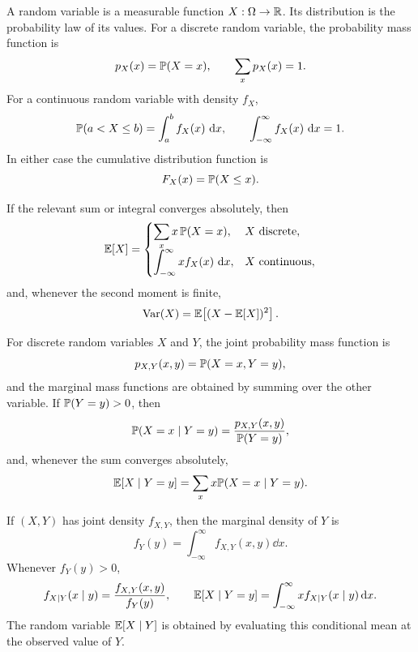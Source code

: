     \begin{definition}
        A random variable is a measurable function $X:\Omega\to\mathbb{R}$. Its
        distribution is the probability law of its values. For a discrete
        random variable, the probability mass function is
        \[
            p_X(x)=\mathbb{P}(X=x),
            \qquad
            \sum_x p_X(x)=1.
        \]
        For a continuous random variable with density $f_X$,
        \[
            \mathbb{P}(a<X\leq b)=\int_a^b f_X(x)\,\mathop{}\!\mathrm{d} x,
            \qquad
            \int_{-\infty}^{\infty}f_X(x)\,\mathop{}\!\mathrm{d} x=1.
        \]
        In either case the cumulative distribution function is
        \[
            F_X(x)=\mathbb{P}(X\leq x).
        \]
    \end{definition}

    \begin{definition}
        If the relevant sum or integral converges absolutely, then
        \[
            \mathbb{E}[X]
            =
            \begin{cases}
                \displaystyle\sum_x x\,\mathbb{P}(X=x), & X\text{ discrete},\\[1mm]
                \displaystyle\int_{-\infty}^{\infty}x f_X(x)\,\mathop{}\!\mathrm{d} x,
                & X\text{ continuous},
            \end{cases}
        \]
        and, whenever the second moment is finite,
        \[
            \operatorname{Var}(X)=\mathbb{E}\!\left[(X-\mathbb{E}[X])^2\right].
        \]
    \end{definition}

    \begin{definition}
        For discrete random variables $X$ and $Y$, the joint probability mass
        function is
        \[
            p_{X,Y}(x,y)=\mathbb{P}(X=x,Y=y),
        \]
        and the marginal mass functions are obtained by summing over the other
        variable. If $\mathbb{P}(Y=y)>0$, then
        \[
            \mathbb{P}(X=x\mid Y=y)
            =
            \frac{p_{X,Y}(x,y)}{\mathbb{P}(Y=y)},
        \]
        and, whenever the sum converges absolutely,
        \[
            \mathbb{E}[X\mid Y=y]
            =
            \sum_x x\mathbb{P}(X=x\mid Y=y).
        \]

        If $(X,Y)$ has joint density $f_{X,Y}$, then the marginal density of
        $Y$ is
        \[
            f_Y(y)=\int_{-\infty}^{\infty}f_{X,Y}(x,y)\dd x.
        \]
        Whenever $f_Y(y)>0$,
        \[
            f_{X\mid Y}(x\mid y)
            =
            \frac{f_{X,Y}(x,y)}{f_Y(y)},
            \qquad
            \mathbb{E}[X\mid Y=y]
            =
            \int_{-\infty}^{\infty}x f_{X\mid Y}(x\mid y)\mathop{}\!\mathrm{d} x.
        \]
        The random variable $\mathbb{E}[X\mid Y]$ is obtained by evaluating this
        conditional mean at the observed value of $Y$.
    \end{definition}

